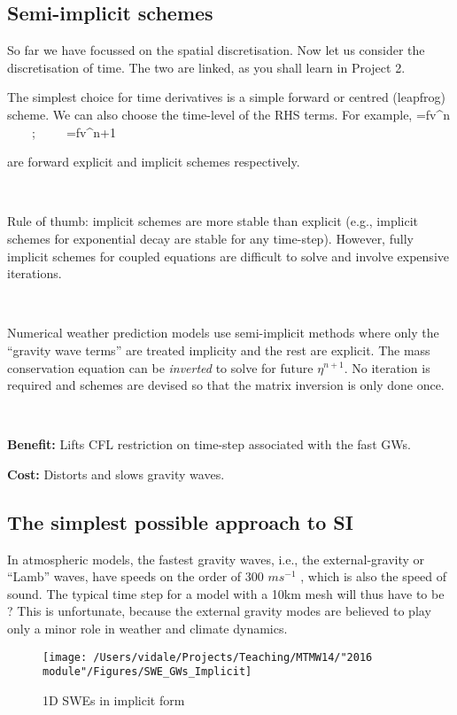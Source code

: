 \subsection{Semi-implicit schemes}

So far we have focussed on the spatial discretisation. Now let us
consider the discretisation of time. The two are linked, as you shall learn in Project 2.

The simplest choice for time derivatives is a simple forward or
centred (leapfrog) scheme. We can also choose the time-level of the RHS terms. For example,
\BEQ
{}=fv^n ~~~~;~~~~~=fv^{n+1}
\EEQ

are forward explicit and implicit schemes respectively.

~

Rule of thumb: implicit schemes are more stable than explicit
(e.g., implicit schemes for exponential decay are stable for any
time-step). However, fully implicit schemes for coupled equations are
difficult to solve and involve expensive iterations. 

~

Numerical weather prediction models use semi-implicit methods where
only the ``gravity wave terms'' are treated implicity and the rest are
explicit. The mass conservation equation can be {\em inverted} to
solve for future $\eta^{n+1}$. No iteration is required and schemes
are devised so that the matrix inversion is only done once. 

~

{\bf Benefit:} Lifts CFL restriction on time-step associated with
the fast GWs.

{\bf Cost:} Distorts and slows gravity waves.


\subsection{The simplest possible approach to SI}

In atmospheric models, the fastest gravity waves, i.e., the external-gravity or “Lamb” waves, have speeds on the order of 300 $m s^{-1}$ , which is also the speed of sound. The typical time step for a model with a 10km mesh will thus have to be \underline{\hspace{1cm}}? This is unfortunate, because the external gravity modes are believed to play only a minor role in weather and climate dynamics. 

\begin{figure}
	\texttt{[image: /Users/vidale/Projects/Teaching/MTMW14/"2016 module"/Figures/SWE\_GWs\_Implicit]}
	\label{fig:Spherical}
	\caption{\label{fig:blue_rectangle} 1D SWEs in implicit form}
\end{figure}

